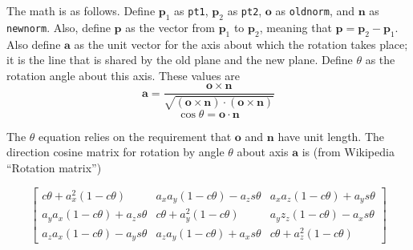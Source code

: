 \documentclass[11pt]{article}
\newcommand {\ttt} {\texttt}
\begin{document}
\begin{description}
The math is as follows. Define $\bm{p}_1$ as \ttt{pt1}, $\bm{p}_2$ as \ttt{pt2}, $\bm{o}$ as \ttt{oldnorm}, and $\bm{n}$ as \ttt{newnorm}. Also, define $\bm{p}$ as the vector from $\bm{p}_1$ to $\bm{p}_2$, meaning that $\bm{p} = \bm{p}_2 - \bm{p}_1$. Also define $\bm{a}$ as the unit vector for the axis about which the rotation takes place; it is the line that is shared by the old plane and the new plane. Define $\theta$ as the rotation angle about this axis. These values are
$$\bm{a} = \frac{\bm{o} \times \bm{n}}{\sqrt{(\bm{o} \times \bm{n})\cdot (\bm{o} \times \bm{n})}}$$
$$\cos \theta = \bm{o} \cdot \bm{n}$$

The $\theta$ equation relies on the requirement that $\bm{o}$ and $\bm{n}$ have unit length. The direction cosine matrix for rotation by angle $\theta$ about axis $\bm{a}$ is (from Wikipedia ``Rotation matrix'')

$$\left[ \begin{array}{ccc}
c\theta+ a_x^2(1-c\theta) & a_x a_y(1-c\theta)-a_z s\theta & a_x a_z (1-c\theta)+a_y s\theta \\
a_y a_x(1-c\theta)+a_zs\theta & c\theta + a_y^2(1-c\theta) & a_y z_z(1-c\theta)-a_x s\theta \\
a_z a_x(1-c\theta)-a_y s\theta & a_z a_y(1-c\theta) + a_x s\theta & c\theta + a_z^2(1-c\theta)
\end{array} \right ]$$

\end{description}



\end{document}
